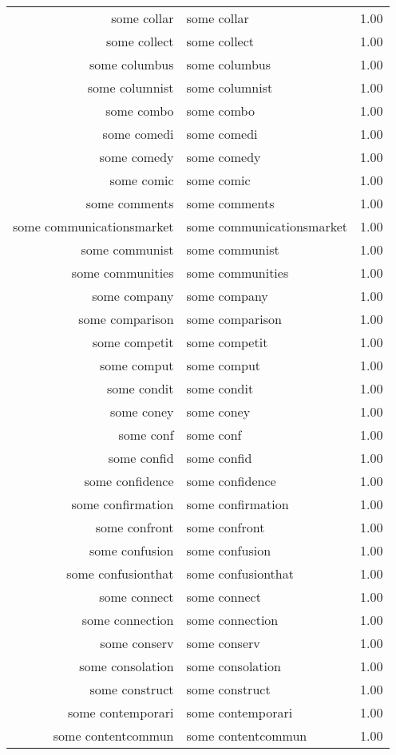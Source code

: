\begin{table}[ht]
\begin{tabular}{rlr}
  some collar & some collar & 1.00 \\ 
  some collect & some collect & 1.00 \\ 
  some columbus & some columbus & 1.00 \\ 
  some columnist & some columnist & 1.00 \\ 
  some combo & some combo & 1.00 \\ 
  some comedi & some comedi & 1.00 \\ 
  some comedy & some comedy & 1.00 \\ 
  some comic & some comic & 1.00 \\ 
  some comments & some comments & 1.00 \\ 
  some communicationsmarket & some communicationsmarket & 1.00 \\ 
  some communist & some communist & 1.00 \\ 
  some communities & some communities & 1.00 \\ 
  some company & some company & 1.00 \\ 
  some comparison & some comparison & 1.00 \\ 
  some competit & some competit & 1.00 \\ 
  some comput & some comput & 1.00 \\ 
  some condit & some condit & 1.00 \\ 
  some coney & some coney & 1.00 \\ 
  some conf & some conf & 1.00 \\ 
  some confid & some confid & 1.00 \\ 
  some confidence & some confidence & 1.00 \\ 
  some confirmation & some confirmation & 1.00 \\ 
  some confront & some confront & 1.00 \\ 
  some confusion & some confusion & 1.00 \\ 
  some confusionthat & some confusionthat & 1.00 \\ 
  some connect & some connect & 1.00 \\ 
  some connection & some connection & 1.00 \\ 
  some conserv & some conserv & 1.00 \\ 
  some consolation & some consolation & 1.00 \\ 
  some construct & some construct & 1.00 \\ 
  some contemporari & some contemporari & 1.00 \\ 
  some contentcommun & some contentcommun & 1.00 \\ 

\end{tabular}
\end{table}
